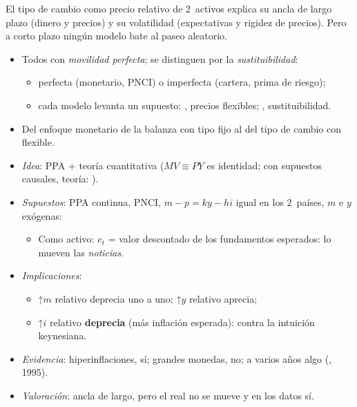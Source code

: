\documentclass{article}
\begin{document}
\begin{columnas}
\begin{ideaclave}
El tipo de cambio como precio relativo de 2~activos explica su ancla de largo plazo (dinero y precios) y su volatilidad (expectativas y rigidez de precios). Pero a corto plazo ningún modelo bate al paseo aleatorio.
\end{ideaclave}
\begin{itemize}
\item Todos con \emph{movilidad perfecta}; se distinguen por la \emph{sustituibilidad}:
  \begin{itemize}
  \item perfecta (monetario, PNCI) o imperfecta (cartera, prima de riesgo);
  \item cada modelo levanta un supuesto: , precios flexibles; , sustituibilidad.
  \end{itemize}
\item Del enfoque monetario de la balanza con tipo fijo  al del tipo de cambio con flexible.
\end{itemize}

\begin{itemize}
\item \emph{Idea}: PPA + teoría cuantitativa ($MV\equiv PY$ es identidad; con supuestos causales, teoría: ).
\item \emph{Supuestos}: PPA continua, PNCI, $m-p=ky-hi$ igual en los 2~países, $m$ e $y$ exógenas:
  \begin{itemize}
  \item Como activo: $e_t$ = valor descontado de los fundamentos esperados: lo mueven las \emph{noticias}.
  \end{itemize}
\item \emph{Implicaciones}:
  \begin{itemize}
  \item ↑$m$ relativo deprecia uno a uno; ↑$y$ relativo aprecia;
  \item ↑$i$ relativo \textbf{deprecia} (más inflación esperada): contra la intuición keynesiana.
  \end{itemize}
\item \emph{Evidencia}: hiperinflaciones, sí; grandes monedas, no; a varios años algo (, 1995).
\item \emph{Valoración}: ancla de largo, pero el real no se mueve y en los datos sí.
\end{itemize}


\end{columnas}
\end{document}
